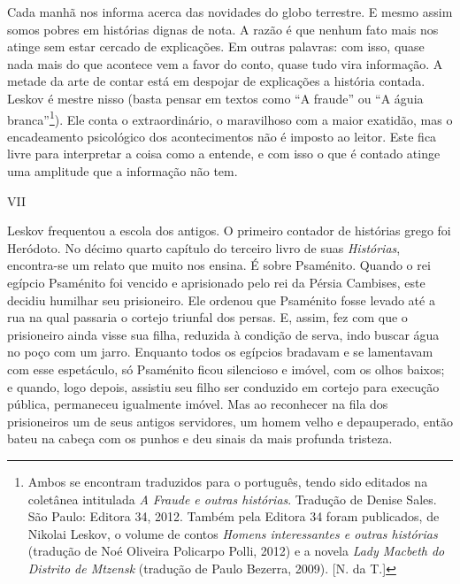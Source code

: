 Cada manhã nos informa acerca das novidades do globo terrestre. E mesmo
assim somos pobres em histórias dignas de nota. A razão é que nenhum
fato mais nos atinge sem estar cercado de explicações. Em outras
palavras: com isso, quase nada mais do que acontece vem a favor do
conto, quase tudo vira informação. A metade da arte de contar está em
despojar de explicações a história contada. Leskov é mestre nisso (basta
pensar em textos como ``A fraude'' ou ``A águia branca''\footnote{Ambos
  se encontram traduzidos para o português, tendo sido editados na
  coletânea intitulada \emph{A Fraude e outras histórias}. Tradução de
  Denise Sales. São Paulo: Editora 34, 2012. Também pela Editora 34
  foram publicados, de Nikolai Leskov, o volume de contos \emph{Homens
  interessantes e outras histórias} (tradução de Noé Oliveira Policarpo
  Polli, 2012) e a novela \emph{Lady Macbeth do Distrito de Mtzensk}
  (tradução de Paulo Bezerra, 2009). {[}N. da T.{]}}). Ele conta o
extraordinário, o maravilhoso com a maior exatidão, mas o encadeamento
psicológico dos acontecimentos não é imposto ao leitor. Este fica livre
para interpretar a coisa como a entende, e com isso o que é contado
atinge uma amplitude que a informação não tem.

VII

Leskov frequentou a escola dos antigos. O primeiro contador de histórias
grego foi Heródoto. No décimo quarto capítulo do terceiro livro de suas
\emph{Histórias}, encontra-se um relato que muito nos ensina. É sobre
Psaménito. Quando o rei egípcio Psaménito foi vencido e aprisionado pelo
rei da Pérsia Cambises, este decidiu humilhar seu prisioneiro. Ele
ordenou que Psaménito fosse levado até a rua na qual passaria o cortejo
triunfal dos persas. E, assim, fez com que o prisioneiro ainda visse sua
filha, reduzida à condição de serva, indo buscar água no poço com um
jarro. Enquanto todos os egípcios bradavam e se lamentavam com esse
espetáculo, só Psaménito ficou silencioso e imóvel, com os olhos baixos;
e quando, logo depois, assistiu seu filho ser conduzido em cortejo para
execução pública, permaneceu igualmente imóvel. Mas ao reconhecer na
fila dos prisioneiros um de seus antigos servidores, um homem velho e
depauperado, então bateu na cabeça com os punhos e deu sinais da mais
profunda tristeza.

